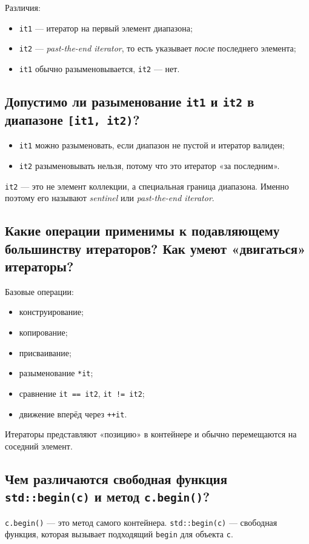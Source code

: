 Различия:
\begin{itemize}
    \item \texttt{it1} — итератор на первый элемент диапазона;
    \item \texttt{it2} — \textit{past-the-end iterator}, то есть указывает \emph{после} последнего элемента;
    \item \texttt{it1} обычно разыменовывается, \texttt{it2} — нет.
\end{itemize}

\subsection{Допустимо ли разыменование \texttt{it1} и \texttt{it2} в диапазоне \texttt{[it1, it2)}?}
\begin{itemize}
    \item \texttt{it1} можно разыменовать, если диапазон не пустой и итератор валиден;
    \item \texttt{it2} разыменовывать нельзя, потому что это итератор «за последним».
\end{itemize}

\begin{remark}
\texttt{it2} — это не элемент коллекции, а специальная граница диапазона. Именно поэтому его называют \textit{sentinel} или \textit{past-the-end iterator}.
\end{remark}

\subsection{Какие операции применимы к подавляющему большинству итераторов? Как умеют «двигаться» итераторы?}
Базовые операции:
\begin{itemize}
    \item конструирование;
    \item копирование;
    \item присваивание;
    \item разыменование \texttt{*it};
    \item сравнение \texttt{it == it2}, \texttt{it != it2};
    \item движение вперёд через \texttt{++it}.
\end{itemize}

Итераторы представляют «позицию» в контейнере и обычно перемещаются на соседний элемент.

\subsection{Чем различаются свободная функция \texttt{std::begin(c)} и метод \texttt{c.begin()}?}
\texttt{c.begin()} — это метод самого контейнера.  
\texttt{std::begin(c)} — свободная функция, которая вызывает подходящий \texttt{begin} для объекта \texttt{c}.

